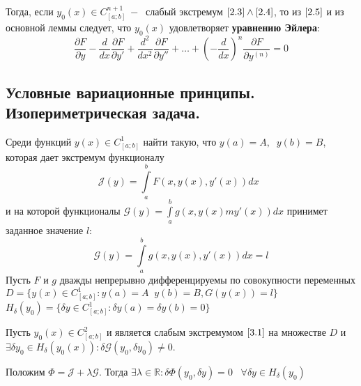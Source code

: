 Тогда, если $y_0(x)\in C^{n+1}_{[a;b]}~-~$ слабый экстремум $\ref{2.3}\wedge\ref{2.4}$, то из $\ref{2.5}$ и из основной леммы следует, что $y_0(x)$ удовлетворяет \textbf{уравнению Эйлера}:
\begin{equation}
    \tag{2.6}
    \label{2.6}
    \frac{\partial F}{\partial y} - \frac{d}{dx}\frac{\partial F}{\partial y'}+\frac{d^2}{dx^2}\frac{\partial F}{\partial y''}+\dots+(-\frac{d}{dx})^n\frac{\partial F}{\partial y^{(n)}}=0
\end{equation}
\subsection{Условные вариационные принципы. Изопериметрическая задача.}
Среди функций $y(x)\in C^1_{[a;b]}$ найти такую, что $y(a)=A,\;\; y(b)=B$, которая дает экстремум функционалу \begin{equation}
    \mathcal{J}(y)=\int\limits_a^b F(x,y(x),y'(x))dx\;\;\label{3.1}\tag{3.1}
\end{equation} 
и на которой функционалы $\mathcal{G}(y) = \int\limits_a^b g(x,y(x)my'(x))dx$ принимет заданное значение $l$:
\begin{equation}
    \tag{3.2}
    \label{3.2}
    \mathcal{G}(y)=\int\limits_a^b g(x,y(x),y'(x))d x=l
\end{equation}
Пусть $F$ и $g$ дважды непрерывно дифференцируемы по совокупности переменных $D=\{y(x)\in C^1_{[a;b]}:y(a)=A\;\;y(b)=B, G(y(x))=l\}$
$H_\delta (y_0)=\{\delta y \in C^1_{[a;b]}:\delta y (a) = \delta  y(b)=0\}$
\begin{theorem}
Пусть $y_0(x)\in C^2_{[a;b]}$ и является слабым экстремумом $\ref{3.1}$ на множестве $D$ и $\exists \delta y_0\in H_\delta (y_0(x)): \delta \mathcal{G}(y_0,\delta y_0)\neq 0.$\par
Положим $\Phi =\mathcal{J}+\lambda\mathcal{G}.$ Тогда $\exists \lambda \in \mathds{R}: \delta \Phi(y_0,\delta y)=0\;\;\;\forall \delta y\in H_\delta(y_0)$
\end{theorem}
